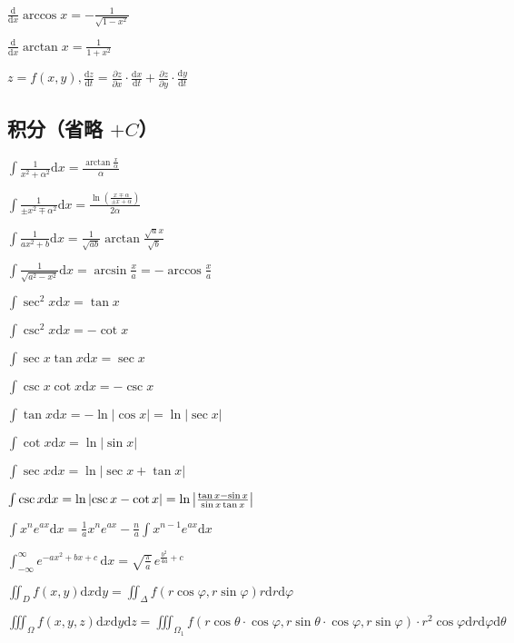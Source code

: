 \documentclass[9pt,landscape]{article}
\begin{document}
\begin{multicols}{3}
$\frac{\mathrm{d}}{\mathrm{d}x}\arccos x=-{\frac {1}{\sqrt {1-x^{2}}}}$

$\frac{\mathrm{d}}{\mathrm{d}x}\arctan x={\frac {1}{1+x^{2}}}$

$z=f(x,y), \frac{\mathrm{d}z}{\mathrm{d}t}=\frac{\partial z}{\partial x}\cdot\frac{\mathrm{d}x}{\mathrm{d}t}+\frac{\partial z}{\partial y}\cdot\frac{\mathrm{d}y}{\mathrm{d}t}$

\subsection{积分（省略 $+C$）}

$ \int {\frac {1}{x^{2}+\alpha ^{2}}}{\mbox{d}}x={\frac {\arctan {\frac {x}{\alpha }}}{\alpha }} $

$ \int {\frac {1}{\pm x^{2}\mp \alpha ^{2}}}{\mbox{d}}x={\frac {\ln \left({\frac {x\mp \alpha }{\pm x+\alpha }}\right)}{2\alpha }} $

$ \int {\frac {1}{ax^{2}+b}}{\mbox{d}}x={\frac {1}{\sqrt {ab}}}\arctan {\frac {{\sqrt {a}}x}{\sqrt {b}}} $

$ \int {\frac {1}{\sqrt {a^{2}-x^{2}}}}{\mbox{d}}x=\arcsin {\frac {x}{a}}=-\arccos {\frac {x}{a}} $

$ \int \sec ^{2}x{\mbox{d}}x=\tan x $

$ \int \csc ^{2}x{\mbox{d}}x=-\cot x $

$ \int \sec x\tan x{\mbox{d}}x=\sec x $

$ \int \csc x\cot x{\mbox{d}}x=-\csc x $

$ \int \tan x{\mbox{d}}x=-\ln {\left|\cos {x}\right|}=\ln {\left|\sec x\right|} $

$ \int \cot x{\mbox{d}}x=\ln {\left|\sin x\right|} $

$ \int \sec x{\mbox{d}}x=\ln {\left|\sec x+\tan x\right|} $

$ \int \csc x{\mbox{d}}x=\ln {\left|\csc x-\cot x\right|}=\ln {\left|{\tan x-\sin x \over \sin x\tan x}\right|} $

$ \int x^{n}e^{ax}{\mbox{d}}x={\frac {1}{a}}x^{n}e^{ax}-{\frac {n}{a}}\int x^{n-1}e^{ax}{\mbox{d}}x $

$ \int _{-\infty }^{\infty }e^{-ax^{2}+bx+c}\,\mathrm{d}x={\sqrt {\frac {\pi }{a}}}\,e^{{\frac {b^{2}}{4a}}+c} $

$ \iint_{D} f(x, y)\mathrm{d}x\mathrm{d}y=\iint_{\Delta}f(r\cos \varphi, r\sin\varphi){r}\mathrm{d}r\mathrm{d}\varphi$

$ \iiint_{\Omega} f(x, y, z) \mathrm{d}x\mathrm{d}y\mathrm{d}z=\iiint_{\Omega_1}f(r\cos\theta\cdot\cos\varphi, r\sin\theta\cdot\cos\varphi, r\sin\varphi)\cdot r^2\cos\varphi\mathrm{d}r\mathrm{d}\varphi\mathrm{d}\theta$


\end{multicols}
\end{document}
